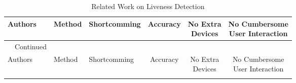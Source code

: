 \begin{landscape}
	\SingleSpacing
	
	\begin{longtable}{p{3cm}p{6cm}p{6cm}ccc} %
		\caption{Related Work on Liveness Detection}
		\label{tab:liveness}
		\\
		
		\toprule
				Authors & Method & Shortcomming & Accuracy & \shortstack{No Extra \\ Devices} &  \shortstack{No Cumbersome \\ User Interaction}  \\
		\midrule
		
		\endfirsthead
		
		\normalfont\tablename~\thetable{}~Continued\\
		\toprule
				Authors & Method & Shortcomming & Accuracy & \shortstack{No Extra \\ Devices} &  \shortstack{No Cumbersome \\ User Interaction}  \\
		\midrule
		
		\endhead
		
		\bottomrule		
		\endfoot
		

\end{longtable}
\end{landscape}
